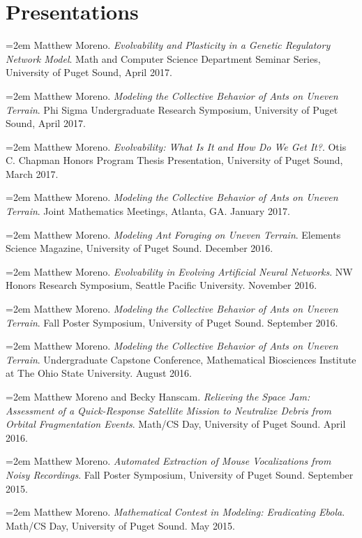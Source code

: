\section{Presentations} 
\hangindent=2em
Matthew Moreno. \textit{Evolvability and Plasticity in a Genetic Regulatory Network Model}. Math and Computer Science Department Seminar Series, University of Puget Sound, April 2017. 

\vspace {-3.5 mm}

\hangindent=2em
Matthew Moreno. \textit{Modeling the Collective Behavior of Ants on Uneven Terrain}. Phi Sigma Undergraduate Research Symposium, University of Puget Sound, April 2017. 

\vspace {-3.5 mm}

\hangindent=2em
Matthew Moreno. \textit{Evolvability: What Is It and How Do We Get It?}. Otis C. Chapman Honors Program Thesis Presentation, University of Puget Sound, March 2017. 

\vspace {-3.5 mm}

\hangindent=2em
Matthew Moreno. \textit{Modeling the Collective Behavior of Ants on Uneven Terrain}. Joint Mathematics Meetings, Atlanta, GA. January 2017. 

\vspace {-3.5 mm}
\hangindent=2em
Matthew Moreno. \textit{Modeling Ant Foraging on Uneven Terrain}. Elements Science Magazine, University of Puget Sound. December 2016. 

\vspace {-3.5 mm}
\hangindent=2em
Matthew Moreno. \textit{Evolvability in Evolving Artificial Neural Networks}. NW Honors Research Symposium, Seattle Pacific University. November 2016. 

\vspace {-3.5 mm}
\hangindent=2em
Matthew Moreno. \textit{Modeling the Collective Behavior of Ants on Uneven Terrain}. Fall Poster Symposium, University of Puget Sound. September 2016. 

\vspace {-3.5 mm}
\hangindent=2em
Matthew Moreno. \textit{Modeling the Collective Behavior of Ants on Uneven Terrain}. Undergraduate Capstone Conference, Mathematical Biosciences Institute at The Ohio State University. August 2016. 

\vspace {-3.5 mm}
\hangindent=2em
Matthew Moreno and Becky Hanscam. \textit{Relieving the Space Jam: Assessment of
a Quick-Response Satellite Mission to Neutralize Debris from Orbital Fragmentation Events}. Math/CS Day, University of Puget Sound. April 2016. 

\vspace {-3.5 mm}
\hangindent=2em
Matthew Moreno. \textit{Automated Extraction of Mouse Vocalizations from Noisy
Recordings}. Fall Poster Symposium, University of Puget Sound. September
2015.

\vspace {-3.5 mm}
\hangindent=2em
Matthew Moreno. \textit{Mathematical Contest in Modeling: Eradicating Ebola}.
Math/CS Day, University of Puget Sound. May 2015.


 \vspace {-3.5 mm}
